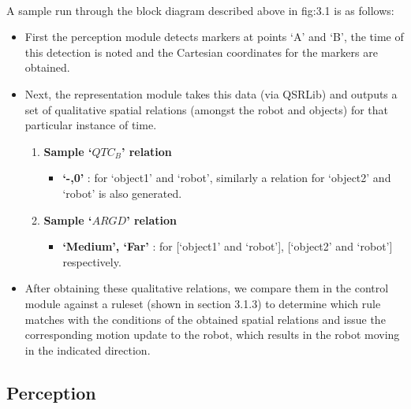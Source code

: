 \paragraph{} A sample run through the block diagram described above in fig:3.1 is as follows:
\begin{itemize}
	\item First the perception module detects markers at points `A' and `B', the time of this detection is noted and the Cartesian coordinates for the markers are obtained.
	\item Next, the representation module takes this data (via QSRLib) and outputs a set of qualitative spatial relations (amongst the robot and objects) for that particular instance of time. 
	\begin{enumerate}
		\item \textbf{Sample `$QTC_B$' relation}
		\begin{itemize}
			\item \textbf{`-,0'} : for `object1' and `robot', similarly a relation for `object2' and `robot' is also generated.
		\end{itemize}
			
		\item \textbf{Sample `$ARGD$' relation}
		\begin{itemize}
			\item \textbf{`Medium', `Far'} :  for [`object1' and `robot'], [`object2' and `robot'] respectively.
		\end{itemize}
	\end{enumerate} 

	\item After obtaining these qualitative relations, we compare them in the control module against a ruleset (shown in section 3.1.3) to determine which rule matches with the conditions of the obtained spatial relations and issue the corresponding motion update to the robot, which results in the robot moving in the indicated direction.
	
\end{itemize}

\subsection{Perception}
